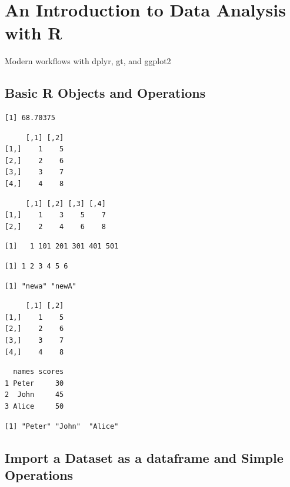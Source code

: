 \documentclass[
  letterpaper,
  DIV=11,
  numbers=noendperiod]{scrreprt}
\renewcommand{\[}{\begin{equation}}
\renewcommand{\]}{\end{equation}}
\begin{document}

\chapter{An Introduction to Data Analysis with
R}\label{an-introduction-to-data-analysis-with-r}

Modern workflows with dplyr, gt, and ggplot2

\hfill\break

\section{Basic R Objects and
Operations}\label{basic-r-objects-and-operations}

\begin{verbatim}
[1] 68.70375
\end{verbatim}

\begin{verbatim}
     [,1] [,2]
[1,]    1    5
[2,]    2    6
[3,]    3    7
[4,]    4    8
\end{verbatim}

\begin{verbatim}
     [,1] [,2] [,3] [,4]
[1,]    1    3    5    7
[2,]    2    4    6    8
\end{verbatim}

\begin{verbatim}
[1]   1 101 201 301 401 501
\end{verbatim}

\begin{verbatim}
[1] 1 2 3 4 5 6
\end{verbatim}

\begin{verbatim}
[1] "newa" "newA"
\end{verbatim}

\begin{verbatim}
     [,1] [,2]
[1,]    1    5
[2,]    2    6
[3,]    3    7
[4,]    4    8
\end{verbatim}

\begin{verbatim}
  names scores
1 Peter     30
2  John     45
3 Alice     50
\end{verbatim}

\begin{verbatim}
[1] "Peter" "John"  "Alice"
\end{verbatim}

\section{Import a Dataset as a dataframe and Simple
Operations}\label{import-a-dataset-as-a-dataframe-and-simple-operations}
\end{document}
